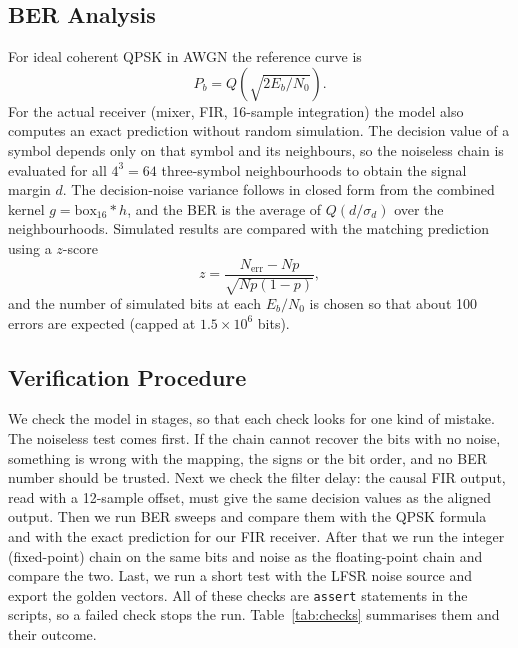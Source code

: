 \documentclass[10pt,twocolumn,letterpaper]{article}
\begin{document}
\subsection{BER Analysis}

For ideal coherent QPSK in AWGN the reference curve is
\begin{equation}
P_b=Q\!\left(\sqrt{2E_b/N_0}\right).
\end{equation}
For the actual receiver (mixer, FIR, 16-sample integration) the model also
computes an exact prediction without random simulation. The decision value of
a symbol depends only on that symbol and its neighbours, so the noiseless
chain is evaluated for all $4^3=64$ three-symbol neighbourhoods to obtain the
signal margin $d$. The decision-noise variance follows in closed form from the
combined kernel $g=\mathrm{box}_{16}\ast h$, and the BER is the average of
$Q(d/\sigma_d)$ over the neighbourhoods. Simulated results are compared with
the matching prediction using a $z$-score
\begin{equation}
z=\frac{N_{\mathrm{err}}-N p}{\sqrt{Np(1-p)}},
\end{equation}
and the number of simulated bits
at each $E_b/N_0$ is chosen so that about 100 errors are expected (capped at
$1.5\times10^6$ bits).

\subsection{Verification Procedure}
\label{sec:verif}

We check the model in stages, so that each check looks for one kind of
mistake. The noiseless test comes first. If the chain cannot recover the bits
with no noise, something is wrong with the mapping, the signs or the bit
order, and no BER number should be trusted. Next we check the filter delay:
the causal FIR output, read with a 12-sample offset, must give the same
decision values as the aligned output. Then we run BER sweeps and compare
them with the QPSK formula and with the exact prediction for our FIR
receiver. After that we run the integer (fixed-point) chain on the same bits
and noise as the floating-point chain and compare the two. Last, we run a
short test with the LFSR noise source and export the golden vectors. All of
these checks are \texttt{assert} statements in the scripts, so a failed check
stops the run. Table~\ref{tab:checks} summarises them and their outcome.
\end{document}
